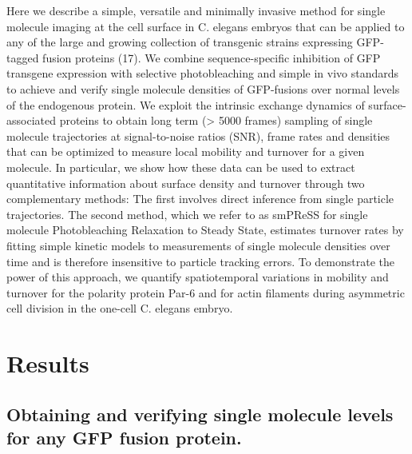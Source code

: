  
 Here we describe a simple, versatile and minimally invasive method for single molecule imaging at the cell surface in C. elegans embryos that can be applied to any of the large and growing collection of transgenic strains expressing GFP-tagged fusion proteins (17). We combine sequence-specific inhibition of GFP transgene expression with selective photobleaching and simple in vivo standards to achieve and verify single molecule densities of GFP-fusions over normal levels of the endogenous protein. We exploit the intrinsic exchange dynamics of surface-associated proteins to obtain long term (> 5000 frames) sampling of single molecule trajectories at signal-to-noise ratios (SNR), frame rates and densities that can be optimized to measure local mobility and turnover for a given molecule. In particular, we show how these data can be used to extract quantitative information about surface density and turnover through two complementary methods: The first involves direct inference from single particle trajectories. The second method, which we refer to as smPReSS for single molecule Photobleaching Relaxation to Steady State, estimates turnover rates by fitting simple kinetic models to measurements of single molecule densities over time and is therefore insensitive to particle tracking errors. To demonstrate the power of this approach, we quantify spatiotemporal variations in mobility and turnover for the polarity protein Par-6 and for actin filaments during asymmetric cell division in the one-cell C. elegans embryo.
 
 \section{Results}
 
 \subsection{Obtaining and verifying single molecule levels for any GFP fusion protein.}
 
